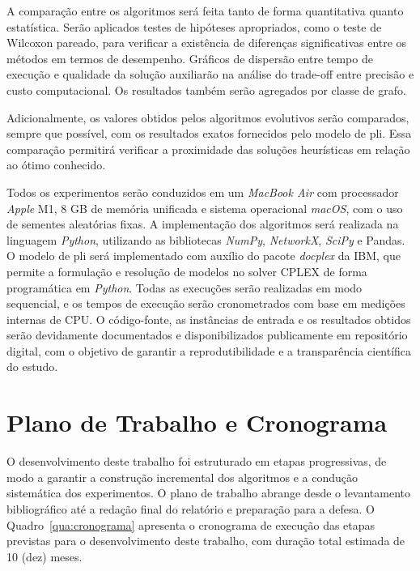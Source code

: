 A comparação entre os algoritmos será feita tanto de forma quantitativa quanto estatística. Serão aplicados testes de hipóteses apropriados, como o teste de Wilcoxon pareado, para verificar a existência de diferenças significativas entre os métodos em termos de desempenho. Gráficos de dispersão entre tempo de execução e qualidade da solução auxiliarão na análise do trade-off entre precisão e custo computacional. Os resultados também serão agregados por classe de grafo.

Adicionalmente, os valores obtidos pelos algoritmos evolutivos serão comparados, sempre que possível, com os resultados exatos fornecidos pelo modelo de \gls{pli}. Essa comparação permitirá verificar a proximidade das soluções heurísticas em relação ao ótimo conhecido.

Todos os experimentos serão conduzidos em um \textit{MacBook Air} com processador \textit{Apple} M1, 8 GB de memória unificada e sistema operacional \textit{macOS}, com o uso de sementes aleatórias fixas. A implementação dos algoritmos será realizada na linguagem \textit{Python}, utilizando as bibliotecas \textit{NumPy}, \textit{NetworkX}, \textit{SciPy} e Pandas. O modelo de \gls{pli} será implementado com auxílio do pacote \textit{docplex} da IBM, que permite a formulação e resolução de modelos no solver CPLEX de forma programática em \textit{Python}. Todas as execuções serão realizadas em modo sequencial, e os tempos de execução serão cronometrados com base em medições internas de CPU. O código-fonte, as instâncias de entrada e os resultados obtidos serão devidamente documentados e disponibilizados publicamente em repositório digital, com o objetivo de garantir a reprodutibilidade e a transparência científica do estudo.

\newpage

\section{Plano de Trabalho e Cronograma}

O desenvolvimento deste trabalho foi estruturado em etapas progressivas, de modo a garantir a construção incremental dos algoritmos e a condução sistemática dos experimentos. O plano de trabalho abrange desde o levantamento bibliográfico até a redação final do relatório e preparação para a defesa. O Quadro~\ref{qua:cronograma} apresenta o cronograma de execução das etapas previstas para o desenvolvimento deste trabalho, com duração total estimada de 10 (dez) meses.

